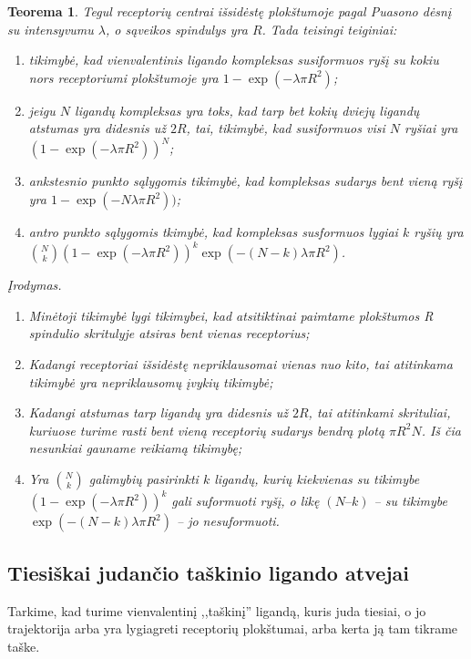 \documentclass[10pt]{article}
\newtheorem{thm}{Teorema}
\begin{document}
\begin{thm}\label{thm:1}
Tegul receptorių centrai išsidėstę plokštumoje  pagal Puasono dėsnį su intensyvumu $\lambda$, o sąveikos spindulys yra $R$. Tada teisingi teiginiai:
\begin{enumerate}
	\item tikimybė, kad vienvalentinis ligando kompleksas susiformuos ryšį su kokiu nors receptoriumi plokštumoje yra $1-\exp(-\lambda \pi R^{2})$;
	\item jeigu $N$ ligandų kompleksas yra toks, kad tarp bet kokių dviejų ligandų atstumas  yra didesnis už $2R$, tai, tikimybė, kad susiformuos  visi $N$ ryšiai  yra $(1-\exp(-\lambda \pi R^{2}))^N$;
	\item ankstesnio punkto  sąlygomis  tikimybė, kad kompleksas  sudarys bent vieną ryšį yra 
	$1-\exp(-N \lambda \pi R^{2}))$;
	\item antro punkto sąlygomis tkimybė, kad kompleksas susformuos lygiai $k$ ryšių yra 
	 $ \binom{N}{k} \left( 1-\exp(-\lambda \pi R^{2}) \right) ^ k \exp(-(N-k) \lambda \pi R^{2})  $. 
	
	
	
\end{enumerate}
Įrodymas. 
\begin{enumerate}
\item  Minėtoji tikimybė lygi tikimybei, kad atsitiktinai paimtame plokštumos   R spindulio skritulyje atsiras bent vienas receptorius;
\item Kadangi receptoriai išsidėstę nepriklausomai vienas nuo kito, tai atitinkama tikimybė yra nepriklausomų įvykių tikimybė;
\item Kadangi atstumas tarp ligandų yra didesnis už $2R$, tai atitinkami skrituliai, kuriuose turime rasti bent vieną receptorių sudarys bendrą plotą $\pi R^2 N $. Iš čia nesunkiai gauname reikiamą tikimybę;
\item Yra  $\binom {N}{k}$ galimybių pasirinkti $k$ ligandų,  kurių kiekvienas su tikimybe $\left( 1-\exp(-\lambda \pi R^{2}) \right) ^ k$ gali suformuoti ryšį, o likę $( N – k )$ -- su tikimybe $\exp(-(N-k) \lambda \pi R^{2})$ -- jo nesuformuoti. 
\end{enumerate}


\end{thm}


\subsection{Tiesiškai judančio taškinio ligando atvejai}
Tarkime, kad turime vienvalentinį ,,taškinį'' ligandą, kuris juda tiesiai, o jo trajektorija arba yra lygiagreti receptorių plokštumai, arba kerta ją tam tikrame taške.
\end{document}
